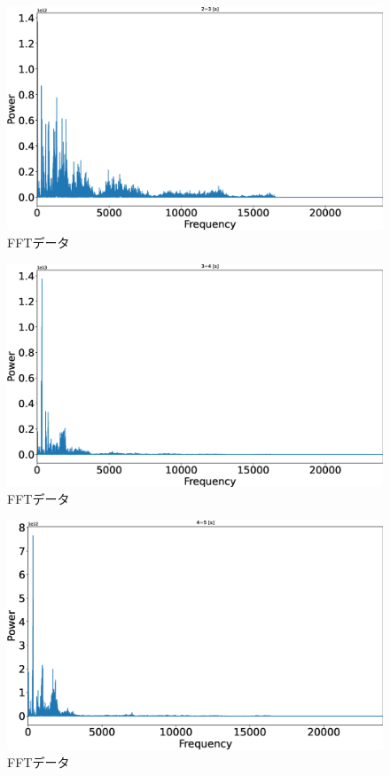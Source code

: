 \documentclass[a4j,10pt]{jarticle}
\begin{document}
\begin{figure}[h]
  \begin{center}
    \includegraphics[width=1\textwidth]{2.eps}
    \caption{FFTデータ}
  \end{center}
\end{figure}

\begin{figure}[h]
  \begin{center}
    \includegraphics[width=1\textwidth]{3.eps}
    \caption{FFTデータ}
  \end{center}
\end{figure}

\begin{figure}[h]
  \begin{center}
    \includegraphics[width=1\textwidth]{4.eps}
    \caption{FFTデータ}
  \end{center}
\end{figure}
\end{document}
